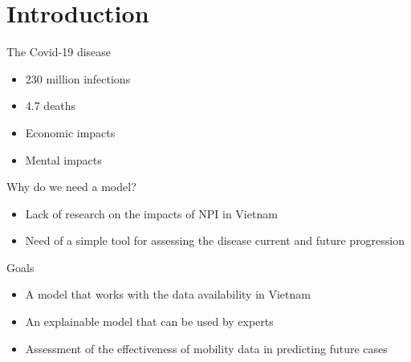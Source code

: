 \section{Introduction}

\begin{frame}{The Covid-19 disease}
\begin{itemize}
    \item 230 million infections
    \item 4.7 deaths
    \item Economic impacts
    \item Mental impacts
\end{itemize}
\end{frame}

\begin{frame}{Why do we need a model?}
\begin{itemize}
    \item Lack of research on the impacts of \gls{NPI} in Vietnam
    \item Need of a simple tool for assessing the disease current and future progression
\end{itemize}
\end{frame}

\begin{frame}{Goals}
\begin{itemize}
    \item A model that works with the data availability in Vietnam
    \item An explainable model that can be used by experts
    \item Assessment of the effectiveness of mobility data in predicting future cases
\end{itemize}
\end{frame}
